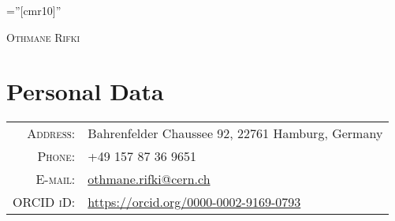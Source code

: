\documentclass[a4paper,10pt]{article}
\begin{document}

\pagestyle{empty} %

\font\fb=''[cmr10]'' %

\par{\centering
		{\Huge \textsc{Othmane Rifki}
	}\bigskip\par}

\section{Personal Data}

\begin{tabular}{rl}
    \textsc{Address:}   					& Bahrenfelder Chaussee 92, 22761 Hamburg, Germany		        \\
    \textsc{Phone:}     				    & +49 157 87 36 9651								            \\
    \textsc{E-mail:}     					& \href{mailto:othmane.rifki@cern.ch}{othmane.rifki@cern.ch}	\\
    \textsc{ORCID iD:}						& \href{https://orcid.org/0000-0002-9169-0793}{https://orcid.org/0000-0002-9169-0793}
\end{tabular}


\vspace{3mm}
\end{document}
